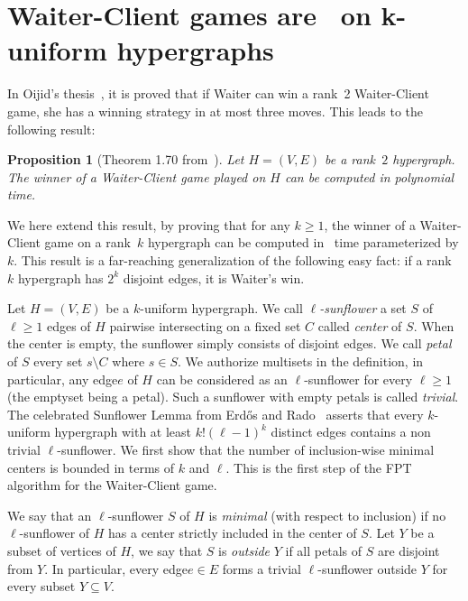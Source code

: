 \documentclass{article}
\newcommand{\hyp}{H}
\newcommand{\WS}{E}
\newcommand{\som}{V}
\newcommand{\hxf}{\hyp = (\som, \WS)}
\newcommand{\hedge}{edge\xspace}
\newcommand{\hedges}{edges\xspace}
\newtheorem{proposition}[theorem]{Proposition}
\begin{document}
\section{Waiter-Client games are \FPT\ on k-uniform hypergraphs} \label{sec: waiter-client}



In Oijid's thesis~\cite{oij2024thesis}, it is proved that if Waiter can win a rank~2 Waiter-Client game, she has a winning strategy in at most three moves. This leads to the following result:

\begin{proposition}[Theorem 1.70 from~\cite{oij2024thesis}]\label{prop: rank 2 Waiter-Client}
    Let $\hxf$ be a rank~$2$ hypergraph. The winner of a Waiter-Client game played on $\hyp$ can be computed in polynomial time.
\end{proposition}

We here extend this result, by proving that for any $k \ge 1$, the winner of a Waiter-Client game on a rank~$k$ hypergraph can be computed in \FPT\ time parameterized by $k$. This result is a far-reaching generalization of the following easy fact: if a rank~$k$ hypergraph has $2^k$ disjoint \hedges, it is Waiter's win.

Let $H=(V,E)$ be a $k$-uniform hypergraph. We call \emph{$\ell$-sunflower} a set $S$ of $\ell \geq 1$ \hedges of $H$ pairwise intersecting on a fixed set $C$ called \emph{center} of $S$. When the center is empty, the sunflower simply consists of disjoint \hedges. We call \emph{petal} of $S$ every set $s\setminus C$ where $s\in S$.
We authorize multisets in the definition, in particular, any \hedge $e$ of $H$ can be considered as an $\ell$-sunflower for every $\ell\geq 1$ (the emptyset being a petal). Such a sunflower with empty petals is called \emph{trivial}. The celebrated Sunflower Lemma from Erd\H{o}s and Rado~\cite{ER60} asserts that every $k$-uniform hypergraph with at least $k!(\ell-1)^k$ distinct \hedges contains a non trivial $\ell$-sunflower. We first show that the number of inclusion-wise minimal centers is bounded in terms of $k$ and $\ell$. This is the first step of the FPT algorithm for the Waiter-Client game.

We say that an $\ell$-sunflower $S$ of $H$ is \emph{minimal} (with respect to inclusion) if 
no $\ell$-sunflower of $H$ has a center strictly included in the center of $S$. Let $Y$ be a subset of vertices of $H$, we say that $S$ is \emph{outside} $Y$ if all petals of $S$ are disjoint from $Y$. In particular, every \hedge \(e \in E\) forms a trivial \(\ell\)-sunflower outside \(Y\) for every subset \(Y \subseteq V\).
\end{document}
